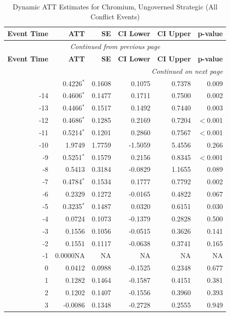 \begin{longtable}{rrrrrr}
\caption{Dynamic ATT Estimates for Chromium, Ungoverned Strategic (All Conflict Events)} \label{tab:chromium_all_conflict_events} \\
\toprule
\textbf{Event Time} & \textbf{ATT} & \textbf{SE} & \textbf{CI Lower} & \textbf{CI Upper} & \textbf{p-value} \\
\midrule
\endfirsthead
\multicolumn{6}{c}{\textit{Continued from previous page}} \\
\toprule
\textbf{Event Time} & \textbf{ATT} & \textbf{SE} & \textbf{CI Lower} & \textbf{CI Upper} & \textbf{p-value} \\
\midrule
\endhead
\midrule \multicolumn{6}{r}{\textit{Continued on next page}} \\
\endfoot
\bottomrule
\endlastfoot
-15 & 0.4226$^{*}$ & 0.1608 & 0.1075 & 0.7378 & 0.009 \\
-14 & 0.4606$^{*}$ & 0.1477 & 0.1711 & 0.7500 & 0.002 \\
-13 & 0.4466$^{*}$ & 0.1517 & 0.1492 & 0.7440 & 0.003 \\
-12 & 0.4686$^{*}$ & 0.1285 & 0.2169 & 0.7204 & $<$0.001 \\
-11 & 0.5214$^{*}$ & 0.1201 & 0.2860 & 0.7567 & $<$0.001 \\
-10 & 1.9749 & 1.7759 & -1.5059 & 5.4556 & 0.266 \\
-9 & 0.5251$^{*}$ & 0.1579 & 0.2156 & 0.8345 & $<$0.001 \\
-8 & 0.5413 & 0.3184 & -0.0829 & 1.1655 & 0.089 \\
-7 & 0.4784$^{*}$ & 0.1534 & 0.1777 & 0.7792 & 0.002 \\
-6 & 0.2329 & 0.1272 & -0.0165 & 0.4822 & 0.067 \\
-5 & 0.3235$^{*}$ & 0.1487 & 0.0320 & 0.6151 & 0.030 \\
-4 & 0.0724 & 0.1073 & -0.1379 & 0.2828 & 0.500 \\
-3 & 0.1556 & 0.1056 & -0.0515 & 0.3626 & 0.141 \\
-2 & 0.1551 & 0.1117 & -0.0638 & 0.3741 & 0.165 \\
-1 & 0.0000NA & NA & NA & NA & NA \\
0 & 0.0412 & 0.0988 & -0.1525 & 0.2348 & 0.677 \\
1 & 0.1282 & 0.1464 & -0.1587 & 0.4151 & 0.381 \\
2 & 0.1202 & 0.1407 & -0.1556 & 0.3960 & 0.393 \\
3 & -0.0086 & 0.1348 & -0.2728 & 0.2555 & 0.949 \\

\end{longtable}

